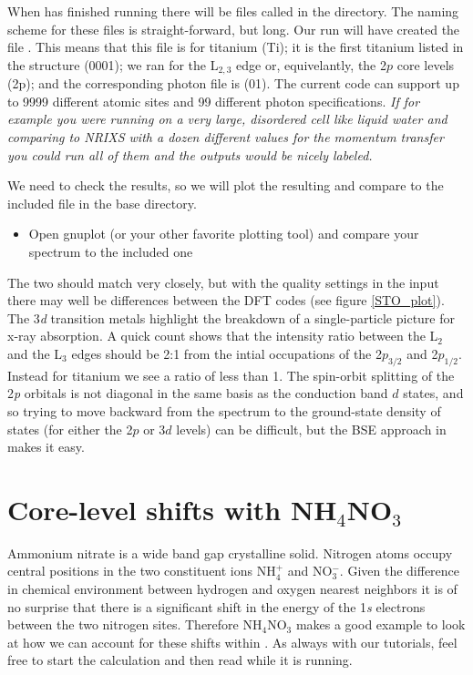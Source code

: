 \documentclass[11pt]{report}
\begin{document}
When  has finished running there will be files called  in the  directory. The naming scheme for these files is straight-forward, but long. Our run will have created the file . This means that this  file is for titanium (Ti); it is the first titanium listed in the structure (0001); we ran for the L$_{2,3}$ edge or, equivelantly, the 2$p$ core levels (2p); and the corresponding photon file is  (01). The current  code can support up to 9999 different atomic sites and 99 different photon specifications. {\it If for example you were running on a very large, disordered cell like liquid water and comparing to NRIXS with a dozen different values for the momentum transfer you could run all of them and the outputs would be nicely labeled.}

We need to check the results, so we will plot the resulting  and compare to the included  file in the base  directory.
\begin{itemize}
\item Open gnuplot (or your other favorite plotting tool) and compare your spectrum to the included one
\end{itemize}
The two should match very closely, but with the quality settings in the input there may well be differences between the DFT codes (see figure \ref{STO_plot}). The 3{\it d} transition metals highlight the breakdown of a single-particle picture for x-ray absorption. A quick count shows that the intensity ratio between the L$_2$ and the L$_3$ edges should be 2:1 from the intial occupations of the 2$p_{3/2}$ and 2$p_{1/2}$. Instead for titanium we see a ratio of less than 1. The spin-orbit splitting of the 2{\it p} orbitals is not diagonal in the same basis as the conduction band $d$ states, and so trying to move backward from the spectrum to the ground-state density of states (for either the 2$p$ or 3$d$ levels) can be difficult, but the BSE approach in  makes it easy.

\section{Core-level shifts with NH$_4$NO$_3$}

Ammonium nitrate is a wide band gap crystalline solid. Nitrogen atoms occupy central positions in the two constituent ions NH$_4^+$ and NO$_3^-$. Given the difference in chemical environment between hydrogen and oxygen nearest neighbors it is of no surprise that there is a significant shift in the energy of the 1{\it s} electrons between the two nitrogen sites. Therefore NH$_4$NO$_3$ makes a good example to look at how we can account for these shifts within . As always with our tutorials, feel free to start the calculation  and then read while it is running.
\end{document}
